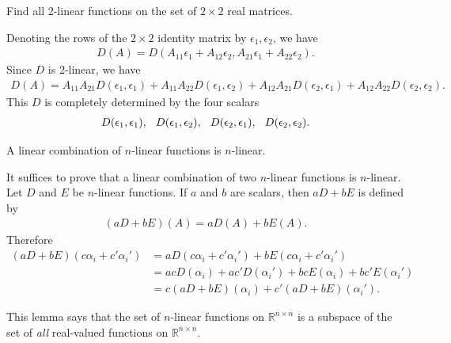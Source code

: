 \documentclass[12pt,letterpaper,reqno]{article}
\numberwithin{equation}{section}
\newcommand{\ti}[1]{\textit{#1}}
\begin{document}
\begin{exercise}
	Find all 2-linear functions on the set of $2 \times 2$ real matrices.	
\end{exercise}

{\color{red} 
Denoting the rows of the $2 \times 2$ identity matrix by $\epsilon_1, \epsilon_2$, we have 
\begin{align*}
	D(A)=D(A_{11}\epsilon_1+A_{12}\epsilon_{2},A_{21}\epsilon_1+A_{22}\epsilon_2).
\end{align*}
Since $D$ is 2-linear, we have 
\begin{align*}
	D(A)=A_{11}A_{21}D(\epsilon_1,\epsilon_1)+A_{11}A_{22}D(\epsilon_1,\epsilon_2)+A_{12}A_{21}D(\epsilon_2,\epsilon_1)+A_{12}A_{22}D(\epsilon_2,\epsilon_2).
\end{align*}
This $D$ is completely determined by the four scalars
\begin{align*}
	D(\epsilon_1,\epsilon_1), \hspace{0.25cm}D(\epsilon_1,\epsilon_2), \hspace{0.25cm}D(\epsilon_2,\epsilon_1), \hspace{0.25cm}D(\epsilon_2,\epsilon_2).
\end{align*}}

\begin{lem}
	A linear combination of $n$-linear functions is $n$-linear.
\end{lem}

\begin{pf}
It suffices to prove that a linear combination of two $n$-linear functions is $n$-linear. Let $D$ and $E$ be $n$-linear functions. If $a$ and $b$ are scalars, then $aD+bE$ is defined by
\begin{align*}
	(aD+bE)(A)=aD(A)+bE(A).
\end{align*}
Therefore
\begin{align*}
	(aD+bE)(c\alpha_i+c'\alpha_i')&=aD(c\alpha_i+c'\alpha_i')+bE(c\alpha_i+c'\alpha_i') \\
	&=acD(\alpha_i)+ac'D(\alpha_i')+bcE(\alpha_i)+bc'E(\alpha_i') \\
	&=c(aD+bE)(\alpha_i)+c'(aD+bE)(\alpha_i').
\end{align*}	
\end{pf}
This lemma says that the set of $n$-linear functions on $\mathbb{R}^{\overline{n} \times \overline{n}}$ is a subspace of the set of \ti{all} real-valued functions on $\mathbb{R}^{\overline{n} \times \overline{n}}$.
\end{document}
